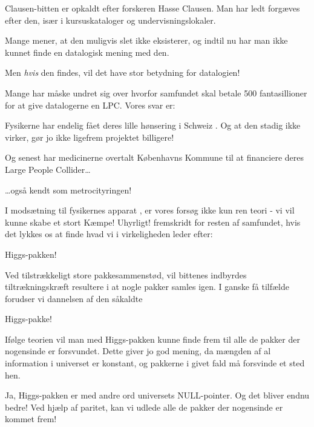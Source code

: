 \documentclass[a4paper,11pt]{article}
\begin{document}
\begin{sketch}
 Clausen-bitten er opkaldt efter forskeren Hasse Clausen. Man har ledt forgæves efter den, især i kursuskataloger og undervisningslokaler.


 Mange mener, at den muligvis slet ikke eksisterer, og indtil nu har man ikke kunnet finde en datalogisk mening med den.

 Men \emph{hvis} den findes, vil det have stor betydning for datalogien!

 Mange har måske undret sig over hvorfor samfundet skal betale 500 fantasillioner for at give datalogerne en LPC. Vores svar er:

 Fysikerne har endelig fået deres lille hønsering i Schweiz . Og at den stadig ikke virker, gør jo ikke ligefrem projektet billigere!

 Og senest har medicinerne overtalt Københavns Kommune til at financiere deres Large People Collider\ldots


 \ldots også kendt som metrocityringen! 


 I modsætning til fysikernes apparat , er vores forsøg ikke kun ren teori - vi vil kunne skabe et stort
 Kæmpe!
 Uhyrligt! fremskridt for resten af samfundet, hvis det lykkes os at finde hvad vi i virkeligheden leder efter:

 Higgs-pakken! 

 Ved tilstrækkeligt store pakkesammenstød, vil bittenes indbyrdes tiltrækningskræft resultere i at nogle pakker samles igen. I ganske få tilfælde forudser vi dannelsen af den såkaldte

 Higgs-pakke! 

 Ifølge teorien vil man med Higgs-pakken kunne finde frem til alle de pakker der nogensinde er forsvundet. Dette giver jo god mening, da mængden af al information i universet er konstant, og pakkerne i givet fald må forsvinde et sted hen.

 Ja, Higgs-pakken er med andre ord universets NULL-pointer. Og det bliver endnu bedre! Ved hjælp af paritet, kan vi udlede alle de pakker der nogensinde er kommet frem!


\end{sketch}
\end{document}
